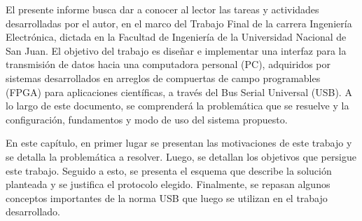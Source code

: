 El presente informe busca dar a conocer al lector las tareas y actividades desarrolladas por el autor, en el marco del Trabajo Final de la carrera Ingeniería Electrónica, dictada en la Facultad de Ingeniería de la Universidad Nacional de San Juan. El objetivo del trabajo es diseñar e implementar una interfaz para la transmisión de datos hacia una computadora personal (PC), adquiridos por sistemas desarrollados en arreglos de compuertas de campo programables (FPGA) para aplicaciones científicas, a través del Bus Serial Universal (USB). A lo largo de este documento, se comprenderá la problemática que se resuelve y la configuración, fundamentos y modo de uso del sistema propuesto.%


En este capítulo, en primer lugar se presentan las motivaciones de este trabajo y se detalla la problemática a resolver. Luego, se detallan los objetivos que persigue este trabajo. Seguido a esto, se presenta el esquema que describe la solución planteada y se justifica el protocolo elegido. Finalmente, se repasan algunos conceptos importantes de la norma USB que luego se utilizan en el trabajo desarrollado.